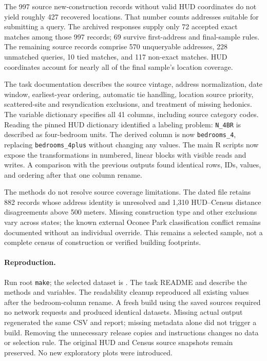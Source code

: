 \documentclass[11pt]{article}
\begin{document}
The 997 source new-construction records without valid HUD coordinates do not
yield roughly 427 recovered locations. That number counts addresses suitable
for submitting a query. The archived responses supply only 72 accepted exact
matches among those 997 records; 69 survive first-address and final-sample rules.
The remaining source records comprise 570 unqueryable addresses, 228 unmatched
queries, 10 tied matches, and 117 non-exact matches. HUD coordinates account for
nearly all of the final sample's location coverage.

The task documentation describes the source vintage, address normalization, date window,
earliest-year ordering, automatic tie handling, location source priority,
scattered-site and resyndication exclusions, and treatment of missing hedonics.
The variable dictionary specifies all 41 columns, including source category
codes. Reading the pinned HUD dictionary identified a labeling problem:
\texttt{N\_4BR} is described as four-bedroom units. The derived column is now
\texttt{bedrooms\_4}, replacing \texttt{bedrooms\_4plus} without changing any
values. The main R scripts now expose the transformations in numbered, linear
blocks with visible reads and writes. A comparison with the previous outputs
found identical rows, IDs, values, and ordering after that one column rename.

The methods do not resolve source coverage limitations. The dated file retains
882 records whose address identity is unresolved and 1,310 HUD--Census distance
disagreements above 500 meters. Missing construction type and other exclusions
vary across states; the known external Oconee Park classification conflict remains
documented without an individual override. This remains a selected sample,
not a complete census of construction or verified building footprints.

\paragraph{Reproduction.} Run root \texttt{make}; the selected dataset is
. The task README and
 describe the methods and variables.
The readability cleanup reproduced all existing values after the bedroom-column
rename. A fresh build using the saved sources required no network requests and
produced identical datasets. Missing actual output regenerated the same CSV and
report; missing metadata alone did not trigger a build. Removing the unnecessary
release copies and instructions changes no data or selection rule. The original
HUD and Census source snapshots remain preserved. No new exploratory plots were
introduced.
\clearpage
\end{document}
